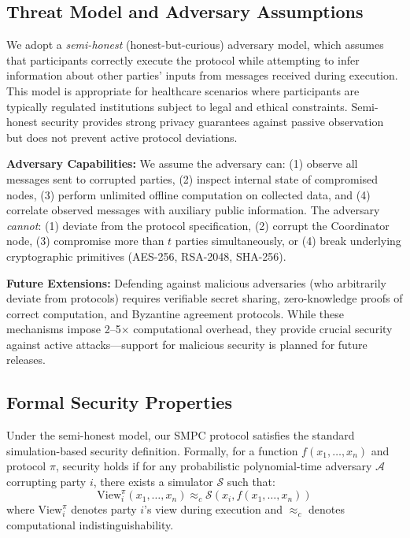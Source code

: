 \documentclass[conference]{IEEEtran}
\begin{document}
\subsection{Threat Model and Adversary Assumptions}
We adopt a \textit{semi-honest} (honest-but-curious) adversary model, which assumes that participants correctly execute the protocol while attempting to infer information about other parties' inputs from messages received during execution. This model is appropriate for healthcare scenarios where participants are typically regulated institutions subject to legal and ethical constraints. Semi-honest security provides strong privacy guarantees against passive observation but does not prevent active protocol deviations.

\textbf{Adversary Capabilities:} We assume the adversary can: (1) observe all messages sent to corrupted parties, (2) inspect internal state of compromised nodes, (3) perform unlimited offline computation on collected data, and (4) correlate observed messages with auxiliary public information. The adversary \textit{cannot}: (1) deviate from the protocol specification, (2) corrupt the Coordinator node, (3) compromise more than $t$ parties simultaneously, or (4) break underlying cryptographic primitives (AES-256, RSA-2048, SHA-256).

\textbf{Future Extensions:} Defending against malicious adversaries (who arbitrarily deviate from protocols) requires verifiable secret sharing, zero-knowledge proofs of correct computation, and Byzantine agreement protocols. While these mechanisms impose 2–5$\times$ computational overhead, they provide crucial security against active attacks—support for malicious security is planned for future releases.

\subsection{Formal Security Properties}
Under the semi-honest model, our SMPC protocol satisfies the standard simulation-based security definition. Formally, for a function $f(x_1, \dots, x_n)$ and protocol $\pi$, security holds if for any probabilistic polynomial-time adversary $\mathcal{A}$ corrupting party $i$, there exists a simulator $\mathcal{S}$ such that:
\[
\text{View}_i^{\pi}(x_1, \dots, x_n) \approx_c \mathcal{S}(x_i, f(x_1, \dots, x_n))
\]
where $\text{View}_i^{\pi}$ denotes party $i$'s view during execution and $\approx_c$ denotes computational indistinguishability.
\end{document}
